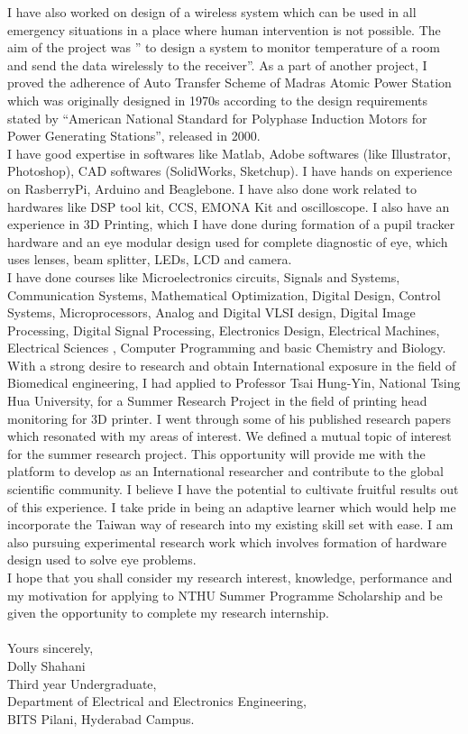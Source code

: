 \documentclass[12pt]{article}
\begin{document}
I have also worked on design of a wireless system which can be used in all emergency situations in a place where human intervention is not possible. The aim of the project was ” to design a system to monitor temperature of a room and send the data wirelessly to the receiver”. As a part of another project, I proved the adherence of Auto Transfer Scheme of Madras Atomic Power Station which was originally designed in 1970s according to the design requirements stated by “American National Standard for Polyphase Induction Motors for Power Generating Stations”, released in 2000. \\


I have good expertise in softwares like Matlab, Adobe softwares (like Illustrator, Photoshop), CAD softwares (SolidWorks, Sketchup). I have hands on experience on RasberryPi, Arduino and Beaglebone.
I have also done work related to hardwares like DSP tool kit, CCS, EMONA Kit and oscilloscope. I also have an experience in 3D Printing, which I have done during formation of a pupil tracker hardware and an eye modular design used for complete diagnostic of eye, which uses lenses, beam splitter, LEDs, LCD and camera.\\

I have done courses like Microelectronics circuits, Signals and Systems, Communication Systems, Mathematical Optimization, Digital Design, Control Systems, Microprocessors, Analog and Digital VLSI design, Digital Image Processing, Digital Signal Processing, Electronics Design, Electrical Machines, Electrical Sciences , Computer Programming and basic Chemistry and Biology.\\

With a strong desire to research and obtain International exposure in the field of Biomedical engineering,  I had applied to Professor Tsai Hung-Yin, National Tsing Hua University, for a Summer Research Project in the field of printing head monitoring for 3D printer. I went through some of his published research papers which resonated with my areas of interest. We defined a mutual topic of interest for the summer research project.
This opportunity will provide me with the platform to develop as an International researcher and contribute to the global scientific community. I believe I have the potential to cultivate fruitful results out of this experience. I take pride in being an adaptive learner which would help me incorporate the Taiwan way of research into my existing skill set with ease. I am also pursuing experimental research work which involves formation of hardware design used to solve eye problems.\\

I hope that you shall consider my research interest, knowledge, performance and my motivation for applying to NTHU Summer Programme Scholarship and be given the opportunity to complete my research internship.\\\\
Yours sincerely,\\
Dolly Shahani\\
Third year Undergraduate,\\
Department of Electrical and Electronics Engineering,\\
BITS Pilani, Hyderabad Campus.
\end{document}
